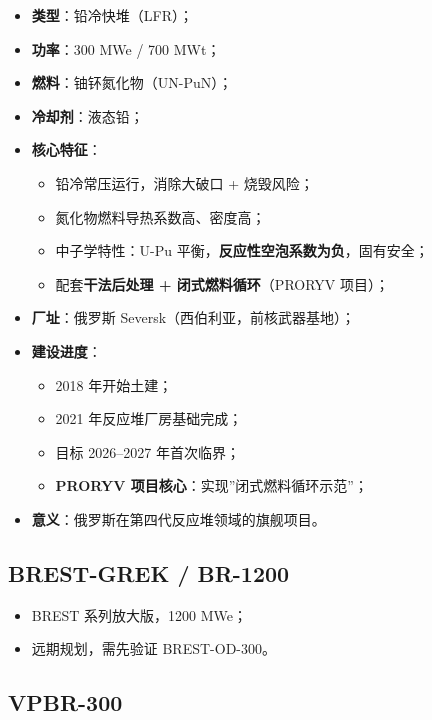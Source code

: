 \documentclass[
  UTF8,
  scheme=plain,
  fontsize=10pt,
  openany
]{ctexbook}
\begin{document}
\begin{itemize}
\tightlist
\item
  \textbf{类型}：铅冷快堆（LFR）；
\item
  \textbf{功率}：300 MWe / 700 MWt；
\item
  \textbf{燃料}：铀钚氮化物（UN-PuN）；
\item
  \textbf{冷却剂}：液态铅；
\item
  \textbf{核心特征}：

  \begin{itemize}
  \tightlist
  \item
    铅冷常压运行，消除大破口 + 烧毁风险；
  \item
    氮化物燃料导热系数高、密度高；
  \item
    中子学特性：U-Pu 平衡，\textbf{反应性空泡系数为负}，固有安全；
  \item
    配套\textbf{干法后处理 + 闭式燃料循环}（PRORYV 项目）；
  \end{itemize}
\item
  \textbf{厂址}：俄罗斯 Seversk（西伯利亚，前核武器基地）；
\item
  \textbf{建设进度}：

  \begin{itemize}
  \tightlist
  \item
    2018 年开始土建；
  \item
    2021 年反应堆厂房基础完成；
  \item
    目标 2026--2027 年首次临界；
  \item
    \textbf{PRORYV 项目核心}：实现''闭式燃料循环示范''；
  \end{itemize}
\item
  \textbf{意义}：俄罗斯在第四代反应堆领域的旗舰项目。
\end{itemize}

\subsection{BREST-GREK / BR-1200}\label{brest-grek-br-1200}

\begin{itemize}
\tightlist
\item
  BREST 系列放大版，1200 MWe；
\item
  远期规划，需先验证 BREST-OD-300。
\end{itemize}

\subsection{VPBR-300}\label{vpbr-300}
\end{document}
